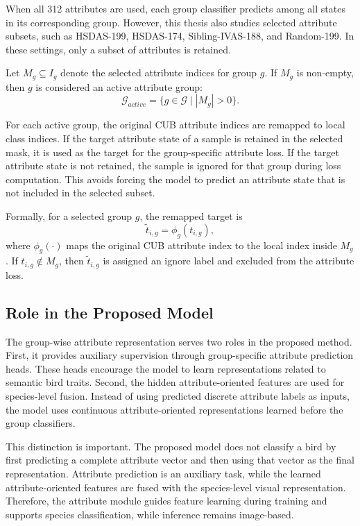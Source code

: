 When all 312 attributes are used, each group classifier predicts among all states in its corresponding group. However, this thesis also studies selected attribute subsets, such as HSDAS-199, HSDAS-174, Sibling-IVAS-188, and Random-199. In these settings, only a subset of attributes is retained.

Let \(M_g \subseteq I_g\) denote the selected attribute indices for group \(g\). If \(M_g\) is non-empty, then \(g\) is considered an active attribute group:
\begin{equation}
    \mathcal{G}_{active}
    =
    \{g \in \mathcal{G} \mid |M_g| > 0\}.
\end{equation}

For each active group, the original CUB attribute indices are remapped to local class indices. If the target attribute state of a sample is retained in the selected mask, it is used as the target for the group-specific attribute loss. If the target attribute state is not retained, the sample is ignored for that group during loss computation. This avoids forcing the model to predict an attribute state that is not included in the selected subset.

Formally, for a selected group \(g\), the remapped target is
\begin{equation}
    \tilde{t}_{i,g}
    =
    \phi_g(t_{i,g}),
\end{equation}
where \(\phi_g(\cdot)\) maps the original CUB attribute index to the local index inside \(M_g\). If \(t_{i,g} \notin M_g\), then \(\tilde{t}_{i,g}\) is assigned an ignore label and excluded from the attribute loss.

\subsection{Role in the Proposed Model}

The group-wise attribute representation serves two roles in the proposed method. First, it provides auxiliary supervision through group-specific attribute prediction heads. These heads encourage the model to learn representations related to semantic bird traits. Second, the hidden attribute-oriented features are used for species-level fusion. Instead of using predicted discrete attribute labels as inputs, the model uses continuous attribute-oriented representations learned before the group classifiers.

This distinction is important. The proposed model does not classify a bird by first predicting a complete attribute vector and then using that vector as the final representation. Attribute prediction is an auxiliary task, while the learned attribute-oriented features are fused with the species-level visual representation. Therefore, the attribute module guides feature learning during training and supports species classification, while inference remains image-based.

